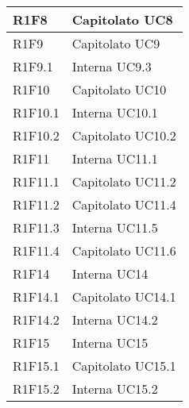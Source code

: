 \begin{center}
\begin{longtable}{|p{22mm}|p{22mm}|}
	\hline
R1F8	& 
	Capitolato \newline
	UC8
\\
\hline	
R1F9	& 
	Capitolato \newline
	UC9
\\
\hline	
R1F9.1	& 
	Interna \newline
	UC9.3
\\
\hline
R1F10	& 
	Capitolato \newline
	UC10
\\
\hline
R1F10.1	& 
	Interna \newline
	UC10.1
\\
\hline	
R1F10.2	& 
	Capitolato \newline
	UC10.2
\\
\hline
R1F11	& 
	Interna \newline
	UC11.1
\\
\hline
R1F11.1	& 
	Capitolato \newline
	UC11.2
\\
\hline
R1F11.2	& 
	Capitolato \newline
	UC11.4
\\
\hline
R1F11.3	& 
	Interna \newline
	UC11.5
\\
\hline
R1F11.4	& 
	Capitolato \newline
	UC11.6
\\
\hline
R1F14	& 
		Interna \newline
		UC14
\\
	\hline
R1F14.1	& 
		Capitolato \newline
		UC14.1 \\
	\hline
R1F14.2	& 
		Interna \newline
		UC14.2
\\
	\hline
R1F15	& 
		Interna \newline
		UC15
\\
	\hline
R1F15.1		& 
	Capitolato \newline
	UC15.1	
	\\
	\hline
R1F15.2	& 
	Interna \newline
	UC15.2	
	\\
	

\end{longtable}
\end{center}
